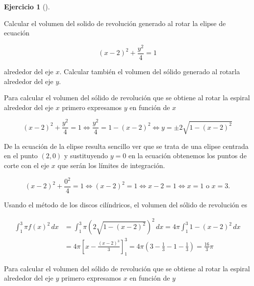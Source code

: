 \documentclass[
  spanish,
  a4paper,
]{scrreport}
\theoremstyle{definition}
\newtheorem{exercise}{Ejercicio}[chapter]
\theoremstyle{remark}
\begin{document}
\begin{exercise}[]\protect\hypertarget{exr-3}{}\label{exr-3}

Calcular el volumen del solido de revolución generado al rotar la elipse
de ecuación

\[
(x-2)^2 + \frac{y^2}{4} = 1
\]

alrededor del eje \(x\). Calcular también el volumen del sólido generado
al rotarla alrededor del eje \(y\).

\end{exercise}

\begin{tcolorbox}[enhanced jigsaw, colbacktitle=quarto-callout-tip-color!10!white, opacityback=0, toptitle=1mm, title=\textcolor{quarto-callout-tip-color}{\faLightbulb}\hspace{0.5em}{Solución}, coltitle=black, opacitybacktitle=0.6, breakable, toprule=.15mm, leftrule=.75mm, titlerule=0mm, colframe=quarto-callout-tip-color-frame, left=2mm, bottomrule=.15mm, bottomtitle=1mm, arc=.35mm, rightrule=.15mm, colback=white]

Para calcular el volumen del sólido de revolución que se obtiene al
rotar la espiral alrededor del eje \(x\) primero expresamos \(y\) en
función de \(x\)

\[
(x-2)^2+\frac{y^2}{4} = 1 
\Leftrightarrow  \frac{y^2}{4} = 1-(x-2)^2
\Leftrightarrow y = \pm 2\sqrt{1-(x-2)^2}
\]

De la ecuación de la elipse resulta sencillo ver que se trata de una
elipse centrada en el punto \((2,0)\) y sustituyendo \(y=0\) en la
ecuación obtenemos los puntos de corte con el eje \(x\) que serán los
límites de integración.

\[
(x-2)^2 + \frac{0^2}{4} = 1 
\Leftrightarrow (x-2)^2 = 1
\Leftrightarrow x-2 = 1
\Leftrightarrow  x=1 \mbox{ o } x=3.
\]

Usando el método de los discos cilíndricos, el volumen del sólido de
revolución es

\begin{align*}
\int_1^3 \pi f(x)^2\,dx 
&= \int_1^3 \pi \left(2\sqrt{1-(x-2)^2}\right)^2\,dx
= 4\pi \int_1^3 1-(x-2)^2\,dx \\
&= 4\pi \left[x-\frac{(x-2)^3}{3}\right]_1^3 
= 4\pi \left(3-\frac{1}{3} - 1 -\frac{1}{3}\right) 
= \frac{16}{3}\pi
\end{align*}

Para calcular el volumen del sólido de revolución que se obtiene al
rotar la espiral alrededor del eje \(y\) primero expresamos \(x\) en
función de \(y\)


\end{tcolorbox}
\end{document}
